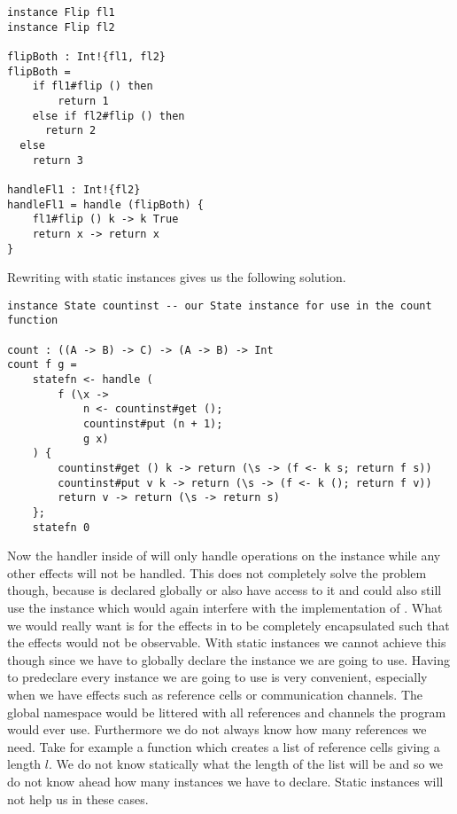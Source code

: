 \begin{verbatim}
instance Flip fl1
instance Flip fl2

flipBoth : Int!{fl1, fl2}
flipBoth =
	if fl1#flip () then
		return 1
	else if fl2#flip () then
	  return 2
  else
   	return 3
   	
handleFl1 : Int!{fl2}
handleFl1 = handle (flipBoth) {
	fl1#flip () k -> k True
	return x -> return x
}
\end{verbatim}

Rewriting  with static instances gives us the following solution.

\begin{verbatim}
instance State countinst -- our State instance for use in the count function

count : ((A -> B) -> C) -> (A -> B) -> Int
count f g =
	statefn <- handle (
		f (\x ->
			n <- countinst#get ();
			countinst#put (n + 1);
			g x)
	) {
		countinst#get () k -> return (\s -> (f <- k s; return f s))
		countinst#put v k -> return (\s -> (f <- k (); return f v))
		return v -> return (\s -> return s)
	};
	statefn 0
\end{verbatim}

Now the  handler inside of  will only handle operations on the  instance while any other  effects will not be handled. This does not completely solve the problem though, because  is declared globally  or  also have access to it and could also still use the instance which would again interfere with the implementation of . What we would really want is for the  effects in  to be completely encapsulated such that the effects would not be observable. With static instances we cannot achieve this though since we have to globally declare the instance we are going to use. Having to predeclare every instance we are going to use is very convenient, especially when we have effects such as reference cells or communication channels. The global namespace would be littered with all references and channels the program would ever use. Furthermore we do not always know how many references we need. Take for example a function  which creates a list of reference cells giving a length $l$. We do not know statically what the length of the list will be and so we do not know ahead how many instances we have to declare. Static instances will not help us in these cases.

